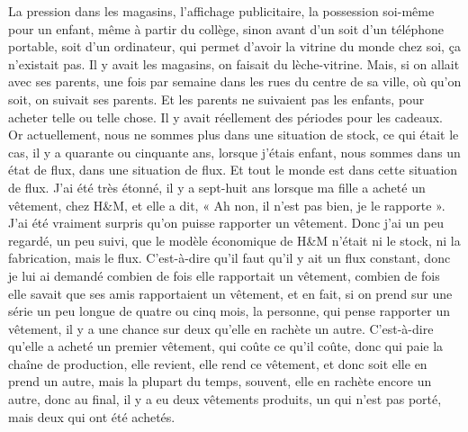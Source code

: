 \begin{description}
La pression dans les magasins, l'affichage publicitaire, la possession soi-même pour un enfant, même à partir du collège, sinon avant d'un soit d'un téléphone portable, soit d'un ordinateur, qui permet d'avoir la vitrine du monde chez soi, ça n'existait pas. Il y avait les magasins, on faisait du lèche-vitrine. Mais, si on allait avec ses parents, une fois par semaine dans les rues du centre de sa ville, où qu'on soit, on suivait ses parents. Et les parents ne suivaient pas les enfants, pour acheter telle ou telle chose. Il y avait réellement des périodes pour les cadeaux. Or actuellement, nous ne sommes plus dans une situation de stock, ce qui était le cas, il y a quarante ou cinquante ans, lorsque j'étais enfant, nous sommes dans un état de flux, dans une situation de flux. Et tout le monde est dans cette situation de flux. 
J'ai été très étonné, il y a sept-huit ans lorsque ma fille a acheté un vêtement, chez H\&M, et elle a dit, « Ah non, il n'est pas bien, je le rapporte ». J'ai été vraiment surpris qu'on puisse rapporter un vêtement. Donc j'ai un peu regardé, un peu suivi, que le modèle économique de H\&M n'était ni le stock, ni la fabrication, mais le flux. C'est-à-dire qu'il faut qu'il y ait un flux constant, donc je lui ai demandé combien de fois elle rapportait un vêtement, combien de fois elle savait que ses amis rapportaient un vêtement, et en fait, si on prend sur une série un peu longue de quatre ou cinq mois, la personne, qui pense rapporter un vêtement, il y a une chance sur deux qu'elle en rachète un autre. C'est-à-dire qu'elle a acheté un premier vêtement, qui coûte ce qu'il coûte, donc qui paie la chaîne de production, elle revient, elle rend ce vêtement, et donc soit elle en prend un autre, mais la plupart du temps, souvent, elle en rachète encore un autre, donc au final, il y a eu deux vêtements produits, un qui n'est pas porté, mais deux qui ont été achetés. 


\end{description}
